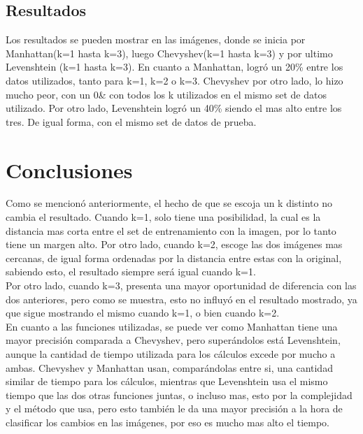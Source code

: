 \documentclass{article}
\begin{document}
\subsection{Resultados}
Los resultados se pueden mostrar en las imágenes, donde se inicia por Manhattan(k=1 hasta k=3), luego Chevyshev(k=1 hasta k=3) y por ultimo Levenshtein (k=1 hasta k=3).
En cuanto a Manhattan, logró un 20\% entre los datos utilizados, tanto para k=1, k=2 o k=3.
Chevyshev por otro lado, lo hizo mucho peor, con un 0\& con todos los k utilizados en el mismo set de datos utilizado.
Por otro lado, Levenshtein logró un 40\% siendo el mas alto entre los tres. De igual forma, con el mismo set de datos de prueba.
\section{Conclusiones}
Como se mencionó anteriormente, el hecho de que se escoja un k distinto no cambia el resultado. Cuando k=1, solo tiene una posibilidad, la cual es la distancia mas corta entre el set de entrenamiento con la imagen, por lo tanto tiene un margen alto. Por otro lado, cuando  k=2, escoge las dos imágenes mas cercanas, de igual forma ordenadas por la distancia entre estas con la original, sabiendo esto, el resultado siempre será igual cuando k=1.\\
Por otro lado, cuando k=3, presenta una mayor oportunidad de diferencia con las dos anteriores, pero como se muestra, esto no influyó en el resultado mostrado, ya que sigue mostrando el mismo cuando k=1, o bien cuando k=2.
\\
En cuanto a las funciones utilizadas, se puede ver como Manhattan tiene una mayor precisión comparada a Chevyshev, pero superándolos está Levenshtein, aunque la cantidad de tiempo utilizada para los cálculos excede por mucho a ambas. Chevyshev y Manhattan usan, comparándolas entre si, una cantidad similar de tiempo para los cálculos, mientras que Levenshtein usa el mismo tiempo que las dos otras funciones juntas, o incluso mas, esto por la complejidad y el método que usa, pero esto también le da una mayor precisión a la hora de clasificar los cambios en las imágenes, por eso es mucho mas alto el tiempo.\\



\end{document}
